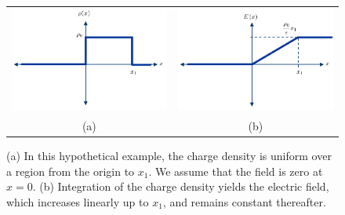 \begin{figure}[tb]
\centering
\begin{tabular}{cc}
\includegraphics[width=.4\columnwidth]{mod2-2_ICtech_sld_13} &
\includegraphics[width=.4\columnwidth]{mod2-2_ICtech_sld_13b}\\
(a) & (b)\\
\end{tabular}
\caption{(a) In this hypothetical example, the charge density is uniform over a region from the origin to $x_1$.  We assume that the field is zero at $x=0$.  (b) Integration of the charge density yields the electric field, which increases linearly up to $x_1$, and remains constant thereafter.} \label{fig:mod2-2_ICtech_sld_13}
\end{figure}
